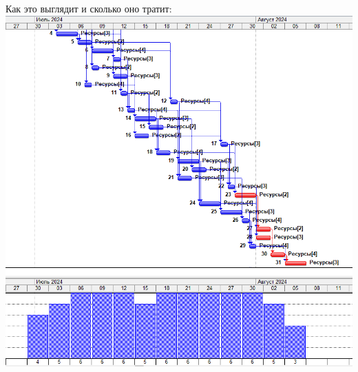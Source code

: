 \documentclass[14pt]{article}
\begin{document}
		{\LARGE Как это выглядит и сколько оно тратит:}\\
		\includegraphics[width=\textwidth]{../img/1a3_answer.png}\\ 
\end{document}
